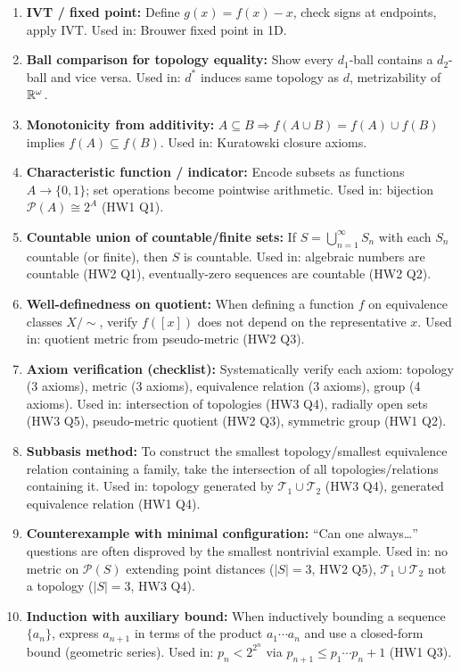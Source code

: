 \documentclass{article}
\begin{document}
\begin{enumerate}
  \item \textbf{IVT / fixed point:} Define $g(x) = f(x) - x$, check
    signs at endpoints, apply IVT.
    Used in: Brouwer fixed point in 1D.

  \item \textbf{Ball comparison for topology equality:} Show every
    $d_1$-ball contains a $d_2$-ball and vice versa.
    Used in: $d^*$ induces same topology as $d$, metrizability of $\mathbb{R}^\omega$.

  \item \textbf{Monotonicity from additivity:} $A \subseteq B
    \Rightarrow f(A \cup B) = f(A) \cup f(B)$ implies $f(A) \subseteq f(B)$.
    Used in: Kuratowski closure axioms.

  \item \textbf{Characteristic function / indicator:} Encode subsets
    as functions $A \to \{0,1\}$; set operations become pointwise
    arithmetic.
    Used in: bijection $\mathcal{P}(A) \cong 2^A$ (HW1 Q1).

  \item \textbf{Countable union of countable/finite sets:} If
    $S = \bigcup_{n=1}^\infty S_n$ with each $S_n$ countable (or
    finite), then $S$ is countable.
    Used in: algebraic numbers are countable (HW2 Q1), eventually-zero
    sequences are countable (HW2 Q2).

  \item \textbf{Well-definedness on quotient:} When defining a
    function $f$ on equivalence classes $X/{\sim}$, verify $f([x])$
    does not depend on the representative $x$.
    Used in: quotient metric from pseudo-metric (HW2 Q3).

  \item \textbf{Axiom verification (checklist):} Systematically
    verify each axiom: topology (3 axioms), metric (3 axioms),
    equivalence relation (3 axioms), group (4 axioms).
    Used in: intersection of topologies (HW3 Q4), radially open sets
    (HW3 Q5), pseudo-metric quotient (HW2 Q3), symmetric group
    (HW1 Q2).

  \item \textbf{Subbasis method:} To construct the smallest
    topology/smallest equivalence relation containing a family, take
    the intersection of all topologies/relations containing it.
    Used in: topology generated by $\mathcal{T}_1 \cup \mathcal{T}_2$
    (HW3 Q4), generated equivalence relation (HW1 Q4).

  \item \textbf{Counterexample with minimal configuration:} ``Can one
    always\ldots'' questions are often disproved by the smallest
    nontrivial example.
    Used in: no metric on $\mathcal{P}(S)$ extending point distances
    ($|S|=3$, HW2 Q5), $\mathcal{T}_1 \cup \mathcal{T}_2$ not a
    topology ($|S|=3$, HW3 Q4).

  \item \textbf{Induction with auxiliary bound:} When inductively
    bounding a sequence $\{a_n\}$, express $a_{n+1}$ in terms of the
    product $a_1 \cdots a_n$ and use a closed-form bound (geometric
    series).
    Used in: $p_n < 2^{2^n}$ via $p_{n+1} \le p_1 \cdots p_n + 1$
    (HW1 Q3).
\end{enumerate}
\end{document}
